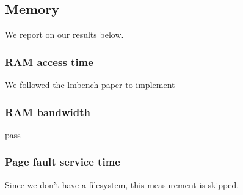 \subsection{Memory}
We report on our results below.
\subsubsection{RAM access time}
We followed the lmbench paper to implement 
\subsubsection{RAM bandwidth}
pass
\subsubsection{Page fault service time}
Since we don't have a filesystem, this measurement is skipped.